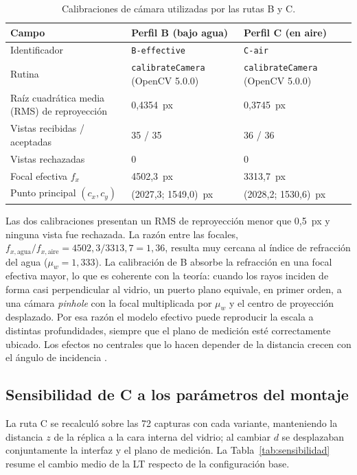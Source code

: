 \begin{table}[H]
\centering\footnotesize
\caption{Calibraciones de cámara utilizadas por las rutas B y C.}
\label{tab:calibraciones}
\begin{tabular}{@{}L{4.2cm}L{4.4cm}L{4.4cm}@{}}
\toprule
Campo & Perfil B (bajo agua) & Perfil C (en aire) \\
\midrule
Identificador & \texttt{B-effective} & \texttt{C-air} \\
Rutina & \texttt{calibrateCamera} (OpenCV 5.0.0) & \texttt{calibrateCamera} (OpenCV 5.0.0) \\
Raíz cuadrática media (RMS) de reproyección & 0,4354~px & 0,3745~px \\
Vistas recibidas / aceptadas & 35 / 35 & 36 / 36 \\
Vistas rechazadas & 0 & 0 \\
Focal efectiva $f_x$ & 4502,3~px & 3313,7~px \\
Punto principal $(c_x, c_y)$ & (2027,3; 1549,0)~px & (2028,2; 1530,6)~px \\
\bottomrule
\end{tabular}
\end{table}

Las dos calibraciones presentan un RMS de reproyección menor que 0,5~px y ninguna vista fue rechazada. La razón entre las focales, $f_{x,\mathrm{agua}}/f_{x,\mathrm{aire}} = 4502{,}3/3313{,}7 = 1{,}36$, resulta muy cercana al índice de refracción del agua ($\mu_w = 1{,}333$). La calibración de B absorbe la refracción en una focal efectiva mayor, lo que es coherente con la teoría: cuando los rayos inciden de forma casi perpendicular al vidrio, un puerto plano equivale, en primer orden, a una cámara \emph{pinhole} con la focal multiplicada por $\mu_w$ y el centro de proyección desplazado. Por esa razón el modelo efectivo puede reproducir la escala a distintas profundidades, siempre que el plano de medición esté correctamente ubicado. Los efectos no centrales que lo hacen depender de la distancia crecen con el ángulo de incidencia \parencite{Rofallski2022}.

\subsection{Sensibilidad de C a los parámetros del montaje}
\label{sec:sensibilidad}

La ruta C se recalculó sobre las 72 capturas con cada variante, manteniendo la distancia $z$ de la réplica a la cara interna del vidrio; al cambiar $d$ se desplazaban conjuntamente la interfaz y el plano de medición. La Tabla~\ref{tab:sensibilidad} resume el cambio medio de la LT respecto de la configuración base.

